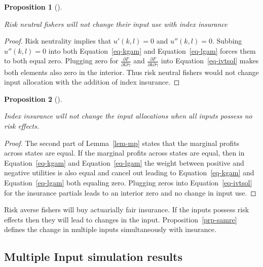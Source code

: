 \documentclass[
  letterpaper,
  DIV=11,
  numbers=noendperiod]{scrartcl}
\theoremstyle{plain}
\theoremstyle{plain}
\newtheorem{proposition}{Proposition}[section]
\theoremstyle{remark}
\begin{document}
\begin{proposition}[]\protect\hypertarget{prp-rn}{}\label{prp-rn}

Risk neutral fishers will not change their input use with index
insurance

\end{proposition}

\begin{proof}

Risk neutrality implies that \(u'(k,l)=0\) and \(u''(k,l)=0\). Subbing
\(u''(k,l)=0\) into both Equation~\ref{eq-kgam} and
Equation~\ref{eq-lgam} forces them to both equal zero. Plugging zero for
\(\frac{\partial F}{\partial l \partial \gamma}\) and
\(\frac{\partial F}{\partial k \partial \gamma}\) into
Equation~\ref{eq-ivtsol} makes both elements also zero in the interior.
Thus risk neutral fishers would not change input allocation with the
addition of index insurance.

\end{proof}

\begin{proposition}[]\protect\hypertarget{prp-rezero}{}\label{prp-rezero}

Index insurance will not change the input allocations when all inputs
possess no risk effects.

\end{proposition}

\begin{proof}

The second part of Lemma~\ref{lem-mp} states that the marginal profits
across states are equal. If the marginal profits across states are
equal, then in Equation~\ref{eq-kgam} and Equation~\ref{eq-lgam} the
weight between positive and negative utilities is also equal and cancel
out leading to Equation~\ref{eq-kgam} and Equation~\ref{eq-lgam} both
equaling zero. Plugging zeros into Equation~\ref{eq-ivtsol} for the
insurance partials leads to an interior zero and no change in input use.

\end{proof}

Risk averse fishers will buy actuarially fair insurance. If the inputs
possess risk effects then they will lead to changes in the input.
Proposition~\ref{prp-samre} defines the change in multiple inputs
simultaneously with insurance.

\hypertarget{sec-simres}{%
\subsection{Multiple Input simulation results}\label{sec-simres}}
\end{document}
